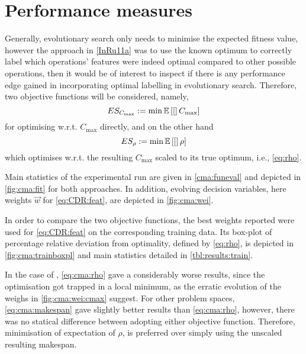 \section{Performance measures}\label{sec:es:measure}
Generally, evolutionary search only needs to minimise the expected fitness 
value, however the  approach in \cref{InRu11a} was to use the known optimum to 
correctly label which operations' features were indeed optimal compared to 
other possible operations, then it would be of interest to inspect if there is 
any performance edge gained in incorporating optimal labelling in evolutionary 
search. Therefore, two objective functions will be considered, namely, 
\begin{equation}
	ES_{C_{\max}} := \min \Exp[C_{\max}] \label{eq:cma:makespan}
\end{equation}
for optimising w.r.t. $C_{\max}$ directly, and on the other hand
\begin{equation}
	ES_{\rho} := \min \Exp[\rho] \label{eq:cma:rho}
\end{equation} 
which optimises w.r.t. the resulting $C_{\max}$ scaled to its true optimum, i.e., \cref{eq:rho}.

Main statistics of the experimental run are given in \cref{cma:funeval} and 
depicted in \cref{fig:cma:fit} for both approaches. In addition, evolving 
decision variables, here weights $\vec{w}$ for \cref{eq:CDR:feat}, are depicted 
in \cref{fig:cma:wei}. 

In order to compare the two objective functions, the best weights reported were 
used for \cref{eq:CDR:feat} on the corresponding training data. Its box-plot of 
percentage relative deviation from optimality, defined by \cref{eq:rho}, is 
depicted in \cref{fig:cma:trainboxpl} and main statistics detailed in 
\cref{tbl:results:train}. 

In the case of , \cref{eq:cma:rho}  gave a considerably worse results, since the optimisation got trapped in a local minimum, as the erratic evolution of the weighs in \cref{fig:cma:wei:cmax} suggest.
For other problem spaces, \cref{eq:cma:makespan} gave slightly better results than \cref{eq:cma:rho}, however, there was no statical difference between adopting either objective function. Therefore, minimisation of expectation of $\rho$, is preferred over simply using the unscaled resulting makespan. 


